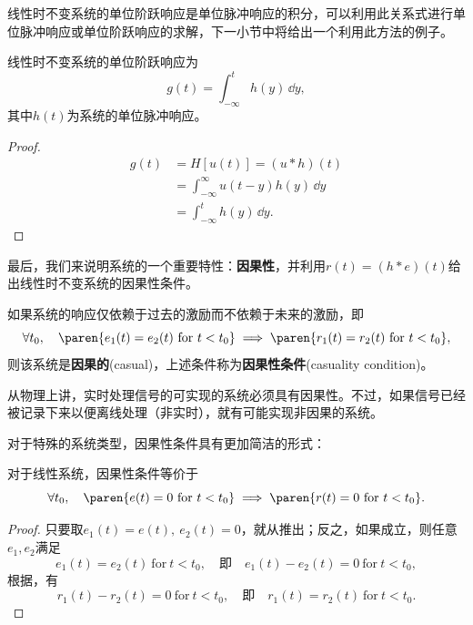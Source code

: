 线性时不变系统的单位阶跃响应是单位脉冲响应的积分，可以利用此关系式进行单位脉冲响应或单位阶跃响应的求解，下一小节中将给出一个利用此方法的例子。

\begin{proposition}[单位阶跃响应]
    \label{prop:step_response}
    线性时不变系统的单位阶跃响应为
    \begin{equation}
        g(t)=\int_{-\infty}^{t}h(y)\,\dd y,
    \end{equation}
    其中$h(t)$为系统的单位脉冲响应。
\end{proposition}
\begin{proof}
    \begin{align}
        g(t)&=H[u(t)]=(u*h)(t)\nonumber\\
        &=\int_{-\infty}^{\infty}u(t-y)h(y)\,\dd y\nonumber\\
        &=\int_{-\infty}^{t}h(y)\,\dd y.
    \end{align}
\end{proof}

最后，我们来说明系统的一个重要特性：\textbf{因果性}，并利用$r(t)=(h*e)(t)$给出线性时不变系统的因果性条件。

\begin{definition}[因果性]
    \label{def:causuality}
    如果系统的响应仅依赖于过去的激励而不依赖于未来的激励，即
    \begin{equation}\label{eq:causality}
        \forall t_0,\quad \paren{e_1(t)=e_2(t)\ \mathrm{for}\ t<t_0}\implies \paren{r_1(t)=r_2(t)\ \mathrm{for}\ t<t_0},
    \end{equation}
    则该系统是\textbf{因果的}(casual)，上述条件称为\textbf{因果性条件}(casuality condition)。
\end{definition}

从物理上讲，实时处理信号的可实现的系统必须具有因果性。不过，如果信号已经被记录下来以便离线处理（非实时），就有可能实现非因果的系统\cite{dsp}。

对于特殊的系统类型，因果性条件具有更加简洁的形式：

\begin{proposition}
    对于线性系统，因果性条件等价于
    \begin{equation}\label{eq:linear_causality}
        \forall t_0,\quad \paren{e(t)=0\ \mathrm{for}\ t<t_0}\implies \paren{r(t)=0\ \mathrm{for}\ t<t_0}.
    \end{equation}
\end{proposition}
\begin{proof}
    只要取$e_1(t)=e(t),\ e_2(t)=0$，就从推出；反之，如果成立，则任意$e_1,e_2$满足
    \begin{equation}
        e_1(t)=e_2(t)\ \mathrm{for}\ t<t_0,\quad\text{即}\quad e_1(t)-e_2(t)=0\ \mathrm{for}\ t<t_0,
    \end{equation}
    根据，有
    \begin{equation}
        r_1(t)-r_2(t)=0\ \mathrm{for}\ t<t_0,\quad\text{即}\quad r_1(t)=r_2(t)\ \mathrm{for}\ t<t_0.
    \end{equation}
\end{proof}

